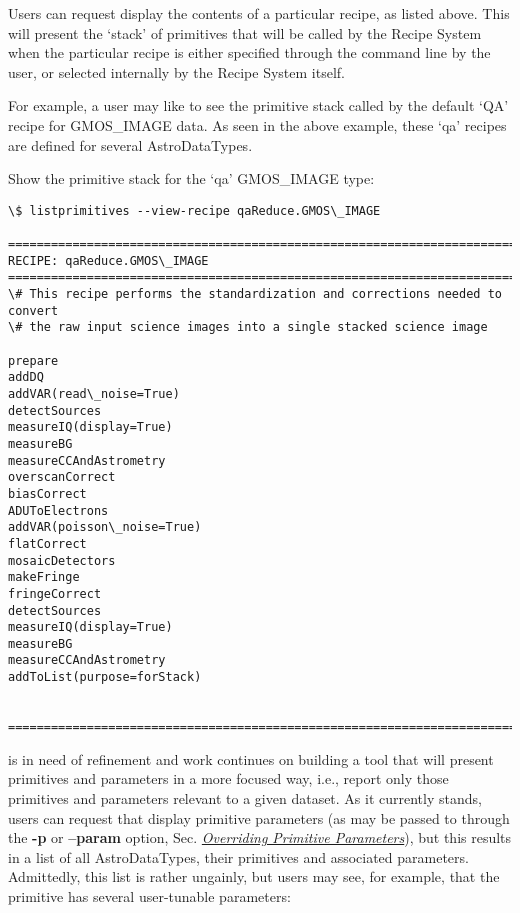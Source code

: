 \documentclass[letterpaper,10pt,english]{sphinxmanual}
\begin{document}
Users can request display the contents of a particular recipe, as listed above.
This will present the `stack' of primitives that will be called by the
Recipe System when the particular recipe is either specified through the
 command line by the user, or selected internally by the Recipe System
itself.

For example, a user may like to see the primitive stack called by the default
`QA' recipe for GMOS\_IMAGE data. As seen in the above example, these `qa' recipes
are defined for several AstroDataTypes.

Show the primitive stack for the `qa' GMOS\_IMAGE type:

\begin{Verbatim}[commandchars=\\\{\}]
\$ listprimitives --view-recipe qaReduce.GMOS\_IMAGE

===============================================================================
RECIPE: qaReduce.GMOS\_IMAGE
===============================================================================
\# This recipe performs the standardization and corrections needed to convert
\# the raw input science images into a single stacked science image

prepare
addDQ
addVAR(read\_noise=True)
detectSources
measureIQ(display=True)
measureBG
measureCCAndAstrometry
overscanCorrect
biasCorrect
ADUToElectrons
addVAR(poisson\_noise=True)
flatCorrect
mosaicDetectors
makeFringe
fringeCorrect
detectSources
measureIQ(display=True)
measureBG
measureCCAndAstrometry
addToList(purpose=forStack)


===============================================================================
\end{Verbatim}

 is in need of refinement and work continues on
building a tool that will present primitives and parameters in a more focused
way, i.e., report only those primitives and parameters relevant to a given
dataset. As it currently stands, users can request that 
display primitive parameters (as may be passed to  through the
\textbf{-p} or \textbf{--param} option, Sec. {\hyperref[interfaces:userpars]{\emph{Overriding Primitive Parameters}}}), but this results in a
list of all AstroDataTypes, their primitives and associated parameters.
Admittedly, this list is rather ungainly, but users may see, for example, that
the primitive  has several user-tunable parameters:
\end{document}
